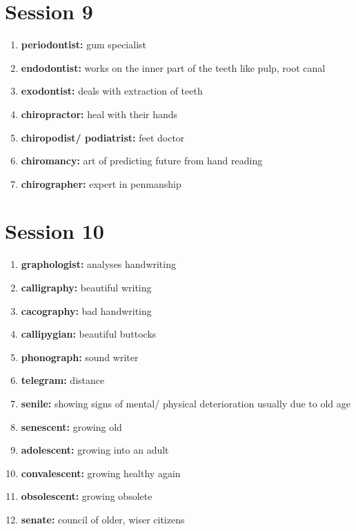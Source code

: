 \documentclass{article}
\begin{document}
\section{Session 9}
\begin{enumerate}
    \item \textbf{periodontist: }{gum specialist}
    \item \textbf{endodontist: }{works on the inner part of the teeth like pulp, root canal}
    \item \textbf{exodontist: }{deals with extraction of teeth}
    \item \textbf{chiropractor: }{heal with their hands}
    \item \textbf{chiropodist/ podiatrist: }{feet doctor}
    \item \textbf{chiromancy: }{art of predicting future from hand reading}
    \item \textbf{chirographer: }{expert in penmanship}
    
\end{enumerate}

\section{Session 10}
\begin{enumerate}
    \item \textbf{graphologist: }{analyses handwriting}
    \item \textbf{calligraphy: }{beautiful writing}
    \item \textbf{cacography: }{bad handwriting}
    \item \textbf{callipygian: }{beautiful buttocks}
    \item \textbf{phonograph: }{sound writer}
    \item \textbf{telegram: }{distance}
    \item \textbf{senile: }{showing signs of mental/ physical deterioration usually due to old age}
    \item \textbf{senescent: }{growing old}
    \item \textbf{adolescent: }{growing into an adult}
    \item \textbf{convalescent: }{growing healthy again}
    \item \textbf{obsolescent: }{growing obsolete}
    \item \textbf{senate: }{council of older, wiser citizens}
    
\end{enumerate}
\end{document}
